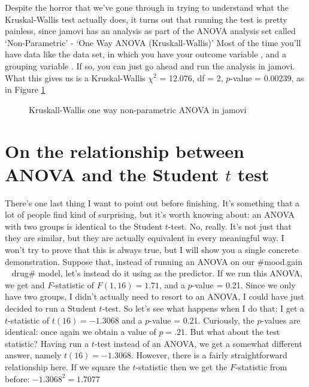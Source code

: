 
Despite the horror that we've gone through in trying to understand what the Kruskal-Wallis test actually does, it turns out that running the test is pretty painless, since jamovi has an analysis as part of the ANOVA analysis set called `Non-Parametric' - `One Way ANOVA (Kruskall-Wallis)' Most of the time you'll have data like the  data set, in which you have your outcome variable , and a grouping variable . If so, you can just go ahead and run the analysis in jamovi. What this gives us is a Kruskal-Wallis $\chi^2$ = 12.076, df = 2, $p$-value = 0.00239, as in Figure \ref{fig:anova6}

\begin{figure}[h]
\begin{center}
\caption{Kruskall-Wallis one way non-parametric ANOVA in jamovi}
\HR
\label{fig:anova6}
\end{center}
\end{figure}


\section{On the relationship between ANOVA and the Student $t$ test~\label{sec:anovaandt}}

There's one last thing I want to point out before finishing. It's something that a lot of people find kind of surprising, but it's worth knowing about: an ANOVA with two groups is identical to the Student $t$-test. No, really. It's not just that they are similar, but they are actually equivalent in every meaningful way. I won't try to prove that this is always true, but I will show you a single concrete demonstration. Suppose that, instead of running an ANOVA on our \rtextverb#mood.gain ~ drug# model, let's instead do it using  as the predictor. If we run this ANOVA, we get and $F$-statistic of  $F(1,16) = 1.71$, and a $p$-value = 0.21. Since we only have two groups, I didn't actually need to resort to an ANOVA, I could have just decided to run a Student $t$-test. So let's see what happens when I do that: I get a $t$-statistic of $t(16) = -1.3068$ and a $p$-value = 0.21. Curiously, the $p$-values are identical: once again we obtain a value of $p = .21$. But what about the test statistic? Having run a $t$-test instead of an ANOVA, we get a somewhat different answer, namely $t(16) = -1.3068$. However, there is a fairly straightforward relationship here. If we square the $t$-statistic then we get the $F$-statistic from before: $-1.3068^2 = 1.7077$





